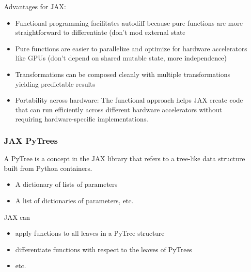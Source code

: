 \begin{frame}
    
    Advantages for JAX:

     \begin{itemize}
         \item Functional programming facilitates autodiff because
             pure functions are more straightforward to differentiate (don't mod
             external state
         \item Pure functions are easier to
             parallelize and optimize for hardware accelerators like GPUs (don't
             depend on shared mutable state, more independence)
         \item Transformations can be composed cleanly with multiple
             transformations yielding predictable results
        \item Portability across hardware: The functional approach helps JAX
            create code that can run efficiently across different hardware
            accelerators without requiring hardware-specific implementations.
     \end{itemize}


\end{frame}

\begin{frame}
    \frametitle{JAX PyTrees}

    A PyTree is a concept in the JAX library that refers to a tree-like data structure built from Python containers.

    \Egs

    \begin{itemize}
        \item A dictionary of lists of parameters
        \item A list of dictionaries of parameters, etc.
    \end{itemize}

    JAX can

    \begin{itemize}
        \item apply functions to all leaves in a PyTree structure
        \item differentiate functions with respect to the leaves of PyTrees
        \item etc.
    \end{itemize}

\end{frame}


\begin{frame}
    
    
    \resizebox{1.0\textwidth}{!}{
        
    }

\end{frame}


